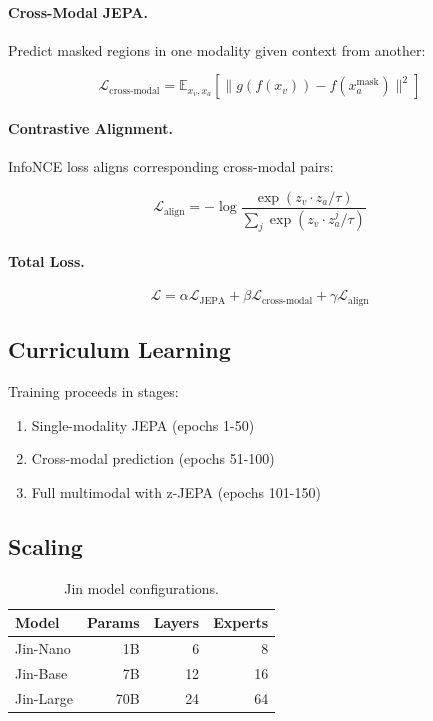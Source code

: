 \documentclass[11pt,twocolumn]{article}
\begin{document}
\paragraph{Cross-Modal JEPA.} Predict masked regions in one modality given context from another:

\begin{equation}
    \mathcal{L}_{\text{cross-modal}} = \mathbb{E}_{x_v, x_a} \left[ \|g(f(x_v)) - f(x_a^{\text{mask}})\|^2 \right]
\end{equation}

\paragraph{Contrastive Alignment.} InfoNCE loss aligns corresponding cross-modal pairs:

\begin{equation}
    \mathcal{L}_{\text{align}} = -\log \frac{\exp(z_v \cdot z_a / \tau)}{\sum_j \exp(z_v \cdot z_a^j / \tau)}
\end{equation}

\paragraph{Total Loss.}
\begin{equation}
    \mathcal{L} = \alpha \mathcal{L}_{\text{JEPA}} + \beta \mathcal{L}_{\text{cross-modal}} + \gamma \mathcal{L}_{\text{align}}
\end{equation}

\subsection{Curriculum Learning}

Training proceeds in stages:
\begin{enumerate}
    \item Single-modality JEPA (epochs 1-50)
    \item Cross-modal prediction (epochs 51-100)
    \item Full multimodal with z-JEPA (epochs 101-150)
\end{enumerate}

\subsection{Scaling}

\begin{table}[h]
\centering
\caption{Jin model configurations.}
\label{tab:scale}
\begin{tabular}{lrrr}
\toprule
\textbf{Model} & \textbf{Params} & \textbf{Layers} & \textbf{Experts} \\
\midrule
Jin-Nano & 1B & 6 & 8 \\
Jin-Base & 7B & 12 & 16 \\
Jin-Large & 70B & 24 & 64 \\
\bottomrule
\end{tabular}
\end{table}
\end{document}
